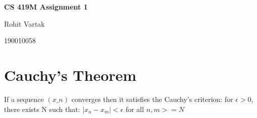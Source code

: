 \documentclass{article}
\begin{document}
\begin{center} \textbf{CS 419M Assignment 1} \end{center} 
\begin{center} Rohit Vartak \end{center} 
 \begin{center}    190010058 \end{center} 

\section{Cauchy's Theorem}

If a sequence $(x\_n)$ converges then it 
satisfies the Cauchy’s criterion: for $\epsilon > 0$,
 there exists N such that: 
 $|x_{n}−x_{m}| < \epsilon $
for all $n, m >= N$
\end{document}
